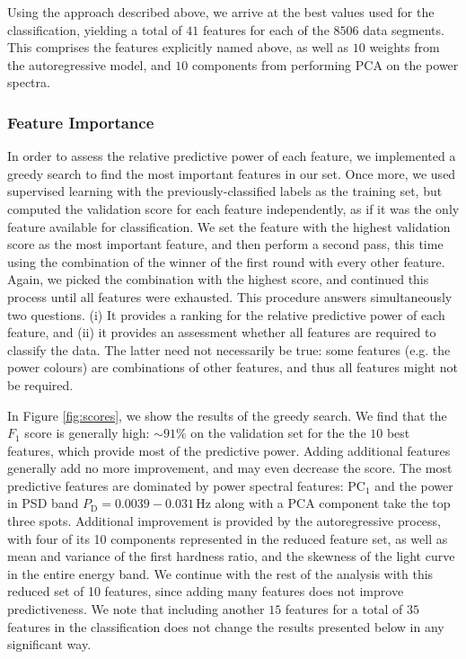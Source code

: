 \documentclass[fleqn,usenatbib]{mnras}
\begin{document}
Using the approach described above, we arrive at the best values used for the classification, yielding a total of $41$ features for each of the $8506$ data segments. This comprises the features explicitly named above, as well as $10$ weights from the autoregressive model, and $10$ components from performing PCA on the power spectra.

\subsubsection{Feature Importance}

In order to assess the relative predictive power of each feature, we implemented a greedy search to find the most important features in our set. 
Once more, we used supervised learning with the previously-classified labels as the training set, but computed the validation score for each feature independently, as if it was the only feature available for classification. We set the feature with the highest validation score as the most important feature, and then perform a second pass, this time using the combination of the winner of the first round with every other feature. Again, we picked the combination with the highest score, and continued this process until all features were exhausted. This procedure answers simultaneously two questions. (i) It provides a ranking for the relative predictive power of each feature, and (ii) it provides an assessment whether all features are required to classify the data. The latter need not necessarily be true: some features (e.g. the power colours) are combinations of other features, and thus all features might not be required.

In Figure \ref{fig:scores}, we show the results of the greedy search. We find that the $F_1$ score is generally high: $\sim\!\! 91\%$ on the validation set for the the $10$ best features, which provide most of the predictive power. Adding additional features generally add no more improvement, and may even decrease the score. The most predictive features are dominated by power spectral features: $\mathrm{PC}_1$ and the power in PSD band  $P_\mathrm{D} = 0.0039-0.031 \,\mathrm{Hz}$ along with a PCA component take the top three spots. Additional improvement is provided by the autoregressive process, with four of its 10 components represented in the reduced feature set, as well as mean and variance of the first hardness ratio, and the skewness of the light curve in the entire energy band. We continue with the rest of the analysis with this reduced set of 10 features, since adding many features does not improve predictiveness. We note that including another $15$ features for a total of $35$ features in the classification does not change the results presented below in any significant way.
\end{document}
